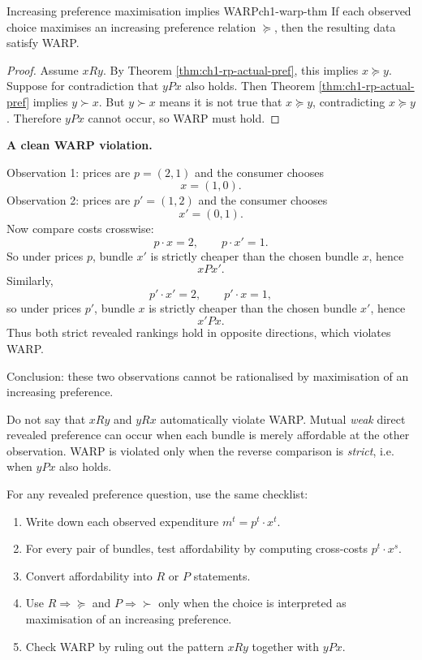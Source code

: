 \begin{theorem}{Increasing preference maximisation implies WARP}{ch1-warp-thm}
If each observed choice maximises an increasing preference relation $\succeq$, then the resulting data satisfy WARP.
\end{theorem}

\begin{proof}
Assume $x R y$. By Theorem \ref{thm:ch1-rp-actual-pref}, this implies $x \succeq y$.
Suppose for contradiction that $y P x$ also holds. Then Theorem \ref{thm:ch1-rp-actual-pref} implies $y \succ x$. But $y \succ x$ means it is not true that $x \succeq y$, contradicting $x \succeq y$. Therefore $y P x$ cannot occur, so WARP must hold.
\end{proof}

\begin{examplebox}
\textbf{A clean WARP violation.}

Observation 1: prices are $p=(2,1)$ and the consumer chooses
\[
x=(1,0).
\]
Observation 2: prices are $p'=(1,2)$ and the consumer chooses
\[
x'=(0,1).
\]
Now compare costs crosswise:
\[
p \cdot x = 2,
\qquad
p \cdot x' = 1.
\]
So under prices $p$, bundle $x'$ is strictly cheaper than the chosen bundle $x$, hence
\[
x P x'.
\]
Similarly,
\[
p' \cdot x' = 2,
\qquad
p' \cdot x = 1,
\]
so under prices $p'$, bundle $x$ is strictly cheaper than the chosen bundle $x'$, hence
\[
x' P x.
\]
Thus both strict revealed rankings hold in opposite directions, which violates WARP.

Conclusion: these two observations cannot be rationalised by maximisation of an increasing preference.
\end{examplebox}

\begin{commonmistake}
Do not say that $x R y$ and $y R x$ automatically violate WARP. Mutual \emph{weak} direct revealed preference can occur when each bundle is merely affordable at the other observation. WARP is violated only when the reverse comparison is \emph{strict}, i.e. when $y P x$ also holds.
\end{commonmistake}

\begin{examtip}
For any revealed preference question, use the same checklist:
\begin{enumerate}
    \item Write down each observed expenditure $m^t = p^t \cdot x^t$.
    \item For every pair of bundles, test affordability by computing cross-costs $p^t \cdot x^s$.
    \item Convert affordability into $R$ or $P$ statements.
    \item Use $R \Rightarrow \succeq$ and $P \Rightarrow \succ$ only when the choice is interpreted as maximisation of an increasing preference.
    \item Check WARP by ruling out the pattern $x R y$ together with $y P x$.
\end{enumerate}
\end{examtip}

